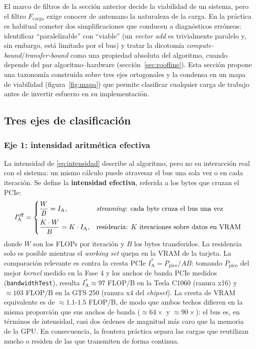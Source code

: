 \documentclass[a4paper,11pt]{article}
\begin{document}
El marco de filtros de la sección anterior decide la viabilidad de un sistema, pero el filtro $F_{\text{carga}}$ exige conocer
de antemano la naturaleza de la carga. En la práctica es habitual cometer dos simplificaciones que conducen a diagnósticos
erróneos: identificar ``paralelizable'' con ``viable'' (un \textit{vector add} es trivialmente paralelo y, sin embargo, está
limitado por el bus) y tratar la dicotomía \textit{compute-bound}/\textit{transfer-bound} como una propiedad absoluta del
algoritmo, cuando depende del par algoritmo--hardware (sección~\ref{sec:roofline}). Esta sección propone una taxonomía
construida sobre tres ejes ortogonales y la condensa en un mapa de viabilidad (figura~\ref{fig:mapa}) que permite clasificar
cualquier carga de trabajo antes de invertir esfuerzo en su implementación.

\subsection{Tres ejes de clasificación}

\subsubsection*{Eje 1: intensidad aritmética efectiva}

La intensidad de \eqref{eq:intensidad} describe al algoritmo, pero no su interacción real con el sistema: un mismo cálculo
puede atravesar el bus una sola vez o en cada iteración. Se define la \textbf{intensidad efectiva}, referida a los bytes que
cruzan el PCIe:
\begin{equation}\label{eq:i_eff}
    I_{\text{A}}^{\text{eff}} =
    \begin{cases}
        \dfrac{W}{B} = I_{\text{A}}, & \text{\textit{streaming}: cada byte cruza el bus una vez} \\[3mm]
        \dfrac{K \cdot W}{B} = K \cdot I_{\text{A}}, & \text{residencia: } K \text{ iteraciones sobre datos en VRAM}
    \end{cases}
\end{equation}
donde $W$ son los FLOPs por iteración y $B$ los bytes transferidos. La residencia solo es posible mientras el
\textit{working set} quepa en la VRAM de la tarjeta. La comparación relevante es contra la cresta PCIe
$I_{\text{A}}^* = P_{\text{pico}}/AB$: tomando $P_{\text{pico}}$ del mejor \textit{kernel} medido en la Fase 4 y los anchos
de banda PCIe medidos (\texttt{bandwidthTest}), resulta $I_{\text{A}}^* \approx 97$ FLOP/B en la Tesla C1060 (ranura x16) y
$\approx 103$ FLOP/B en la GTS 250 (ranura x4 del \textit{chipset}). La cresta de VRAM equivalente es de
$\approx 1.1$-$1.5$ FLOP/B, de modo que ambos techos difieren en la misma proporción que sus anchos de banda
($\approx 64\times$ y $\approx 90\times$): el bus es, en términos de intensidad, casi dos órdenes de magnitud más caro que
la memoria de la GPU. En consecuencia, la frontera práctica separa las cargas que reutilizan mucho o residen de las que
transmiten de forma continua.
\end{document}
